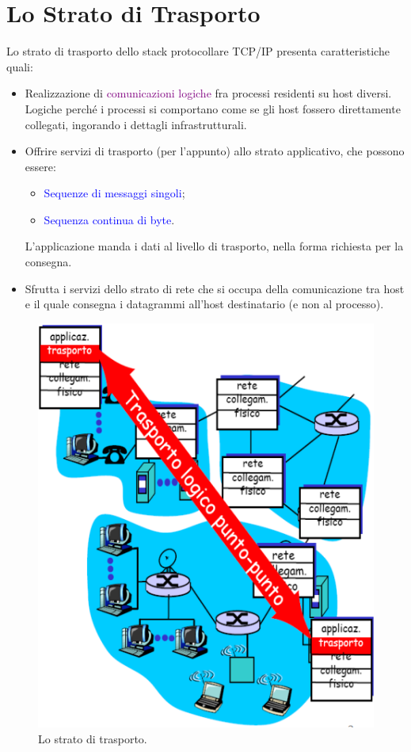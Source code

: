 \section{Lo Strato di Trasporto}
Lo strato di trasporto dello stack protocollare TCP/IP presenta caratteristiche quali:
\begin{itemize}
    \item Realizzazione di \textcolor{purple}{comunicazioni logiche} fra processi residenti su host diversi. Logiche perché i processi si comportano come se gli host fossero direttamente collegati, ingorando i dettagli infrastrutturali.
    \item Offrire servizi di trasporto (per l'appunto) allo strato applicativo, che possono essere:
        \begin{itemize}
            \item \textcolor{blue}{Sequenze di messaggi singoli};
            \item \textcolor{blue}{Sequenza continua di byte}.
        \end{itemize}
        L'applicazione manda i dati al livello di trasporto, nella forma richiesta per la consegna.
    \item Sfrutta i servizi dello strato di rete che si occupa della comunicazione tra host e il quale consegna i datagrammi all'host destinatario (e non al processo).
\end{itemize}

\begin{figure}[h]
    \centering
    \includegraphics[scale=0.5]{Immagini/Lo_Strato_di_Trasporto.png}
    \caption{Lo strato di trasporto.}
\end{figure}


